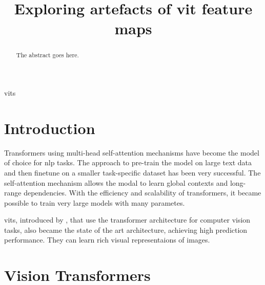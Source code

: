 \documentclass[conference]{IEEEtran}
\begin{document}
  \title{Exploring artefacts of \acl{vit} feature maps}

  \author{
    }

  \maketitle
  \begin{abstract}
  The abstract goes here.
  \end{abstract}

  \begin{IEEEkeywords}
    \acp{vit}
  \end{IEEEkeywords}

  \IEEEpeerreviewmaketitle

  \section{Introduction}

  Transformers \cite{transformer2017} using multi-head self-attention mechanisms have become the model of choice for \ac{nlp} tasks. The approach to pre-train the model on large text data and then finetune on a smaller task-specific dataset has been very successful. The self-attention mechanism allows the modal to learn global contexts and long-range dependencies. With the efficiency and scalability of transformers, it became possible to train very large models with many parametes. \cite{transformer2017} \cite{visiontransformers2021} \cite{vit-state-challenges}

  \acfp{vit}, introduced by \cite{visiontransformers2021}, that use the transformer architecture for computer vision tasks, also became the state of the art architecture, achieving high prediction performance. They can learn rich visual representaions of images. 


  \section{Vision Transformers}

\end{document}

